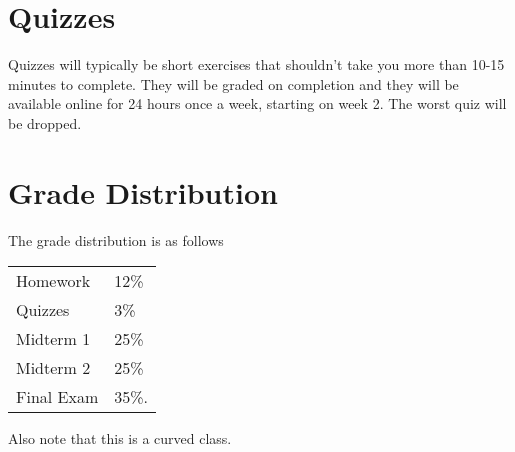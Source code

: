 \documentclass[11pt]{article}
\begin{document}
\section*{Quizzes}
Quizzes will typically be short exercises that shouldn't take you more than 10-15 minutes to complete. 
They will be graded on completion and they will be available online for 24 hours once a week, starting on week 2.
The worst quiz will be dropped.


\begin{comment}
  
  section*{Worksheets}

  There will be a number of worksheet sessions done in class. You are strongly encouraged to work on them in groups and you can turn in your solutions, which will not be
  graded, but I will look at them so I can point out common mistakes and misconceptions before
  the actual exams.Their purpose is to encourage you to discuss some problems
  with other people in class, ask questions, and write down a
  solution for some problems in a stress-free
  environment. You will be notified about worksheet sessions ahead of time.
\end{comment}



%  






\section*{Grade Distribution}
 \indent The grade distribution is as follows\\
\hspace*{40mm}
\begin{center}
\begin{tabular}{ l l }
Homework & 12\% \\
Quizzes & 3\%\\
Midterm  1& 25\% \\
Midterm 2  & 25\% \\
Final Exam  & 35\%.
\end{tabular}
\end{center}
Also note that this is a curved class.\\
\end{document}
